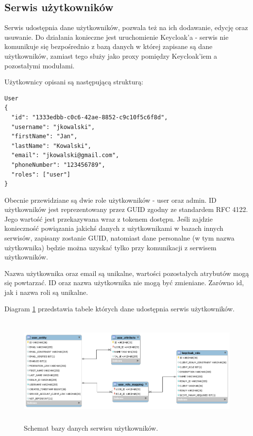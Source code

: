 \documentclass[11pt,a4paper,twoside]{article}
\begin{document}
\subsection{Serwis użytkowników}
Serwis udostępnia dane użytkowników, pozwala też na ich dodawanie, edycję oraz usuwanie. Do działania konieczne jest uruchomienie Keycloak'a  - serwis nie komunikuje się bezpośrednio z bazą danych w której zapisane są dane użytkowników, zamiast tego służy jako proxy pomiędzy Keycloak'iem a pozostałymi modułami.

Użytkownicy opisani są następującą strukturą:

\begin{lstlisting}
User
{
  "id": "1333edbb-c0c6-42ae-8852-c9c10f5c6f8d",
  "username": "jkowalski",
  "firstName": "Jan",
  "lastName": "Kowalski",
  "email": "jkowalski@gmail.com",
  "phoneNumber": "123456789",
  "roles": ["user"]
}
\end{lstlisting}
\vspace{-20pt}
Obecnie przewidziane są dwie role użytkowników - user oraz admin. ID użytkowników jest reprezentowany przez GUID zgodny ze standardem RFC 4122. Jego wartość jest przekazywana wraz z tokenem dostępu. Jeśli zajdzie konieczność powiązania jakichś danych z użytkownikami w bazach innych serwisów, zapisany zostanie GUID, natomiast dane personalne (w tym nazwa użytkownika) będzie można uzyskać tylko przy komunikacji z serwisem użytkowników.

Nazwa użytkownika oraz email są unikalne, wartości pozostałych atrybutów mogą się powtarzać. ID oraz nazwa użytkownika nie mogą być zmieniane. Zarówno id, jak i nazwa roli są unikalne.

Diagram \ref{userDB} przedstawia tabele których dane udostępnia serwis użytkowników.

\begin{figure}[ht]
\caption{Schemat bazy danych serwisu użytkowników.}
\label{userDB}
\centering
\includegraphics[height=5.5cm, width=15.7cm]{userDB}
\end{figure}
\end{document}
